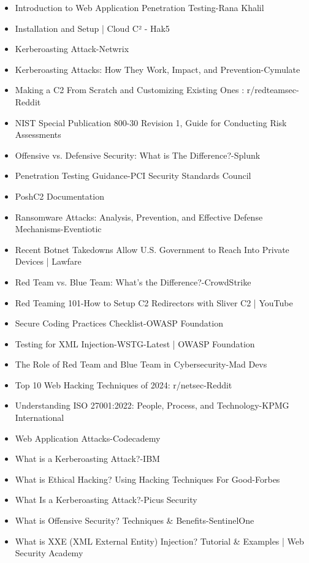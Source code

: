 \begin{itemize}
    \item Introduction to Web Application Penetration Testing-Rana Khalil
    \item Installation and Setup | Cloud C² - Hak5
    \item Kerberoasting Attack-Netwrix
    \item Kerberoasting Attacks: How They Work, Impact, and Prevention-Cymulate
    \item Making a C2 From Scratch and Customizing Existing Ones : r/redteamsec-Reddit
    \item NIST Special Publication 800-30 Revision 1, Guide for Conducting Risk Assessments
    \item Offensive vs. Defensive Security: What is The Difference?-Splunk
    \item Penetration Testing Guidance-PCI Security Standards Council
    \item PoshC2 Documentation
    \item Ransomware Attacks: Analysis, Prevention, and Effective Defense Mechanisms-Eventiotic
    \item Recent Botnet Takedowns Allow U.S. Government to Reach Into Private Devices | Lawfare
    \item Red Team vs. Blue Team: What's the Difference?-CrowdStrike
    \item Red Teaming 101-How to Setup C2 Redirectors with Sliver C2 | YouTube
    \item Secure Coding Practices Checklist-OWASP Foundation
    \item Testing for XML Injection-WSTG-Latest | OWASP Foundation
    \item The Role of Red Team and Blue Team in Cybersecurity-Mad Devs
    \item Top 10 Web Hacking Techniques of 2024: r/netsec-Reddit
    \item Understanding ISO 27001:2022: People, Process, and Technology-KPMG International
    \item Web Application Attacks-Codecademy
    \item What is a Kerberoasting Attack?-IBM
    \item What is Ethical Hacking? Using Hacking Techniques For Good-Forbes
    \item What Is a Kerberoasting Attack?-Picus Security
    \item What is Offensive Security? Techniques \& Benefits-SentinelOne
    \item What is XXE (XML External Entity) Injection? Tutorial \& Examples | Web Security Academy

\end{itemize}
